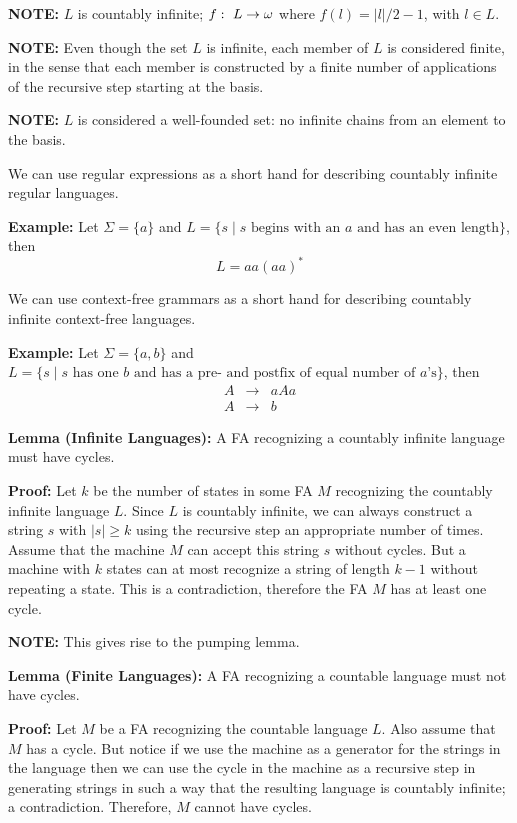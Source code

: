 \documentclass[a4paper,blends,pdf,colorBG,slideColor]{prosper}
\begin{document}
{\bf NOTE:} $L$ is countably infinite; $f\,\colon\; L \rightarrow \omega$ where $f(l) = |l|/2 - 1$, with $l \in L$.

{\bf NOTE:} Even though the set $L$ is infinite, each member of $L$ is considered finite, in the sense that
each member is constructed by a finite number of applications of the recursive step starting at the basis.

{\bf NOTE:} $L$ is considered a well-founded set: no infinite chains from an element to the basis.
\es

We can use regular expressions as a short hand for describing countably infinite regular languages.

{\bf Example:} Let $\Sigma = \{a\}$
and $
L = \{ s \mid \mbox{$s$ begins with an $a$ and has an even length}\}
$, then
\[
L = aa(aa)^*
\]

We can use context-free grammars as a short hand for describing countably infinite context-free languages.

{\bf Example:} Let $\Sigma = \{a,b\}$
and $
L = \{ s \mid \mbox{$s$ has one $b$ and has a pre- and postfix of equal number of $a$'s}\}
$, then
\[
\begin{array}{rcl}
A &\rightarrow& a A a\\
A &\rightarrow& b
\end{array}
\]
\es

{\bf Lemma (Infinite Languages):} A FA recognizing a countably infinite language must have cycles.

{\bf Proof:} Let $k$ be the number of states in some FA $M$ recognizing the countably infinite language
$L$.  Since $L$ is countably infinite, we can always construct a string $s$ with $|s|\ge k$ using the
recursive step an appropriate number of times.  Assume that the machine $M$ can accept this string $s$
without cycles.  But a machine with $k$ states can at most recognize
a string of length $k-1$ without repeating a state.  This is a contradiction, therefore the FA $M$
has at least one cycle.

{\bf NOTE:} This gives rise to the pumping lemma.
\es


{\bf Lemma (Finite Languages):} A FA recognizing a countable language must not have cycles.

{\bf Proof:} Let $M$ be a FA recognizing the countable language $L$.  Also assume that
$M$ has a cycle.  But notice if we use the machine as a generator for the strings
in the language then we can use the cycle in the machine as
a recursive step in generating strings in such a way that the resulting language is
countably infinite; a contradiction.  Therefore, $M$ cannot have cycles.
\es
\end{document}
